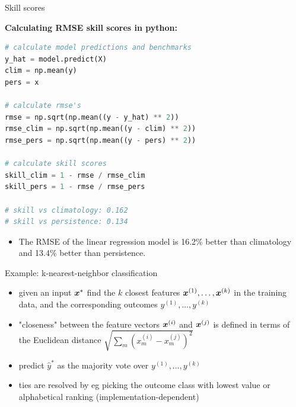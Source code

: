 \documentclass{beamer}
\begin{document}
\begin{frame}[fragile]{Skill scores}

\textbf{Calculating RMSE skill scores in python:}

\begin{lstlisting}[language=python]
# calculate model predictions and benchmarks
y_hat = model.predict(X)
clim = np.mean(y)
pers = x 

# calculate rmse's
rmse = np.sqrt(np.mean((y - y_hat) ** 2))
rmse_clim = np.sqrt(np.mean((y - clim) ** 2))
rmse_pers = np.sqrt(np.mean((y - pers) ** 2))

# calculate skill scores
skill_clim = 1 - rmse / rmse_clim
skill_pers = 1 - rmse / rmse_pers

# skill vs climatology: 0.162
# skill vs persistence: 0.134
\end{lstlisting}

\begin{itemize}
\item The RMSE of the linear regression model is 16.2\% better than climatology and 13.4\% better than persistence.
\end{itemize}


\end{frame}



\begin{frame}{Example: k-nearest-neighbor classification}
\begin{itemize}
\item given an input \(\boldsymbol{x}^*\) find the \(k\) closest features \(\boldsymbol{x}^{(1)}, \dots, \boldsymbol{x}^{(k)}\) in the training data, and the corresponding outcomes \(y^{(1)}, \dots, y^{(k)}\)
\item "closeness" between the feature vectors \(\boldsymbol{x}^{(i)}\) and \(\boldsymbol{x}^{(j)}\) is defined in terms of the Euclidean distance \(\sqrt{\sum_m (x^{(i)}_m - x^{(j)}_m)^2}\)
\item predict \(\hat{y}^*\) as the majority vote over \(y^{(1)}, \dots, y^{(k)}\)
\item ties are resolved by eg picking the outcome class with lowest value or alphabetical ranking (implementation-dependent)
\end{itemize}
\end{frame}
\end{document}

